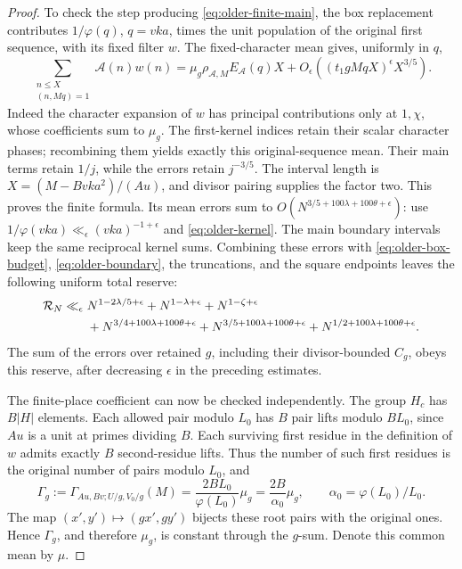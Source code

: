 \begin{proof}
To check the step producing \eqref{eq:older-finite-main}, the box
replacement contributes \(1/\varphi(q)\), \(q=vka\), times the
unit population of the original first sequence, with its fixed
filter \(w\).  The fixed-character mean gives, uniformly in \(q\),
\[
 \sum_{\substack{n\le X\\(n,Mq)=1}}\mathcal A(n)w(n)
  =\mu_g\rho_{\mathcal A,M}E_{\mathcal A}(q)X
       +O_\epsilon((t_1gMqX)^\epsilon X^{3/5}).
\]
Indeed the character expansion of \(w\) has principal contributions
only at \(1,\chi\), whose coefficients sum to \(\mu_g\).
The first-kernel indices retain their scalar character phases;
recombining them yields exactly this original-sequence mean.
Their main terms retain \(1/j\), while the errors retain \(j^{-3/5}\).
The interval length is \(X=(M-Bvka^2)/(Au)\), and divisor pairing
supplies the factor two.  This proves the finite formula.
Its mean errors sum to
\(O(N^{3/5+100\lambda+100\theta+\epsilon})\): use
\(1/\varphi(vka)\ll_\epsilon(vka)^{-1+\epsilon}\) and
\eqref{eq:older-kernel}.
The main boundary intervals keep the same reciprocal kernel sums.
Combining these errors with \eqref{eq:older-box-budget},
\eqref{eq:older-boundary}, the truncations, and the square endpoints
leaves the following uniform total reserve:
\begin{align}
 \mathcal R_N\ll_\epsilon{}&
 N^{1-2\lambda/5+\epsilon}+N^{1-\lambda+\epsilon}
       +N^{1-\zeta+\epsilon}\notag\\
 &+N^{3/4+100\lambda+100\theta+\epsilon}
       +N^{3/5+100\lambda+100\theta+\epsilon}
       +N^{1/2+100\lambda+100\theta+\epsilon}.
 \label{eq:older-uniform-reserve}
\end{align}
The sum of the errors over retained \(g\), including their
divisor-bounded \(C_g\), obeys this reserve, after decreasing
\(\epsilon\) in the preceding estimates.

The finite-place coefficient can now be checked independently.
The group \(H_c\) has \(B|H|\) elements.
Each allowed pair modulo \(L_0\) has \(B\) pair lifts modulo \(BL_0\),
since \(Au\) is a unit at primes dividing \(B\).
Each surviving first residue in the definition of \(w\) admits
exactly \(B\) second-residue lifts.
Thus the number of such first residues is the original number of
pairs modulo \(L_0\), and
\begin{equation}\label{eq:older-filter-normalization}
 \Gamma_g:=
 \Gamma_{Au,Bv;U/g,V_0/g}(M)
       =\frac{2BL_0}{\varphi(L_0)}\mu_g
       =\frac{2B}{\alpha_0}\mu_g,\qquad
                  \alpha_0=\varphi(L_0)/L_0 .
\end{equation}
The map \((x',y')\mapsto(gx',gy')\) bijects these root pairs with
the original ones.  Hence \(\Gamma_g\), and therefore \(\mu_g\),
is constant through the \(g\)-sum.  Denote this common mean by \(\mu\).


\end{proof}
